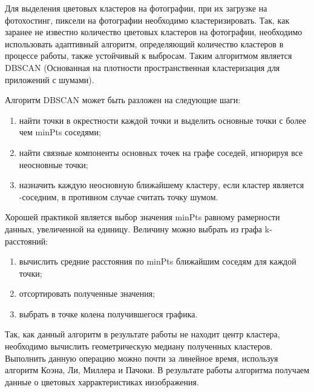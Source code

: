 Для выделения цветовых кластеров на фотографии, при их загрузке на фотохостинг, пиксели на фотографии необходимо кластеризировать.
Так, как заранее не известно количество цветовых кластеров на фотографии, необходимо использовать адаптивный алгоритм, определяющий количество кластеров в процессе работы, также устойчивый к выбросам.
Таким алгоритмом является DBSCAN (Основанная на плотности пространственная кластеризация для приложений с шумами).

Алгоритм DBSCAN может быть разложен на следующие шаги:
\begin{enumerate}
    \item найти точки в \epsilon окрестности каждой точки и выделить основные точки с более чем minPts соседями;
    \item найти связные компоненты основных точек на графе соседей, игнорируя все неосновные точки;
    \item назначить каждую неосновную ближайшему кластеру, если кластер является \epsilon -соседним, в противном случае считать точку шумом.
\end{enumerate}

Хорошей практикой является выбор значения minPts равному рамерности данных, увеличенной на единицу.
Величину \epsilon можно выбрать из графа k-расстояний:
\begin{enumerate}
    \item вычислить средние расстояния по minPts ближайшим соседям для каждой точки;
    \item отсортировать полученные значения;
    \item выбрать \epsilon в точке колена получившегося графика.
\end{enumerate}

Так, как данный алгоритм в результате работы не находит центр кластера, необходимо вычислить геометрическую медиану полученных кластеров.
Выполнить данную операцию можно почти за линейное время, используя алгоритм Коэна, Ли, Миллера и Пачоки.
В результате работы алгоритма получаем данные о цветовых харрактеристиках иизображения.

\clearpage